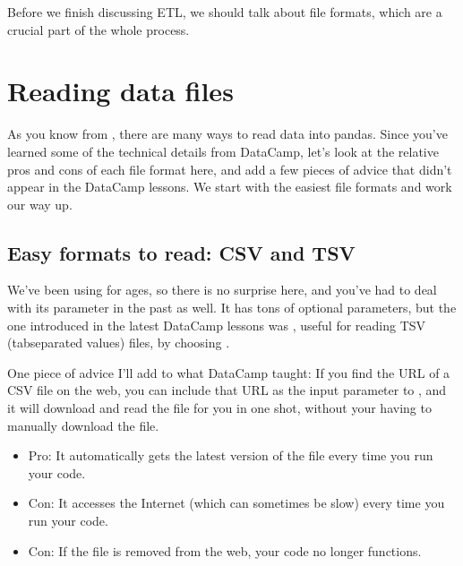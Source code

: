 \documentclass[letterpaper,10pt,english]{jupyterBook}
\begin{document}
\sphinxAtStartPar
Before we finish discussing ETL, we should talk about file formats, which are a crucial part of the whole process.


\section{Reading data files}
\label{\detokenize{chapter-13-etl:reading-data-files}}
\sphinxAtStartPar
As you know from , there are many ways to read data into pandas.  Since you’ve learned some of the technical details from DataCamp, let’s look at the relative pros and cons of each file format here, and add a few pieces of advice that didn’t appear in the DataCamp lessons.  We start with the easiest file formats and work our way up.


\subsection{Easy formats to read: CSV and TSV}
\label{\detokenize{chapter-13-etl:easy-formats-to-read-csv-and-tsv}}
\sphinxAtStartPar
We’ve been using  for ages, so there is no surprise here, and you’ve had to deal with its  parameter in the past as well.  It has tons of optional parameters, but the one introduced in the latest DataCamp lessons was , useful for reading TSV (tab\sphinxhyphen{}separated values) files, by choosing .

\sphinxAtStartPar
One piece of advice I’ll add to what DataCamp taught:  If you find the URL of a CSV file on the web, you can include that URL as the input parameter to , and it will download and read the file for you in one shot, without your having to manually download the file.
\begin{itemize}
\item {} 
\sphinxAtStartPar
Pro: It automatically gets the latest version of the file every time you run your code.

\item {} 
\sphinxAtStartPar
Con: It accesses the Internet (which can sometimes be slow) every time you run your code.

\item {} 
\sphinxAtStartPar
Con: If the file is removed from the web, your code no longer functions.

\end{itemize}
\end{document}
